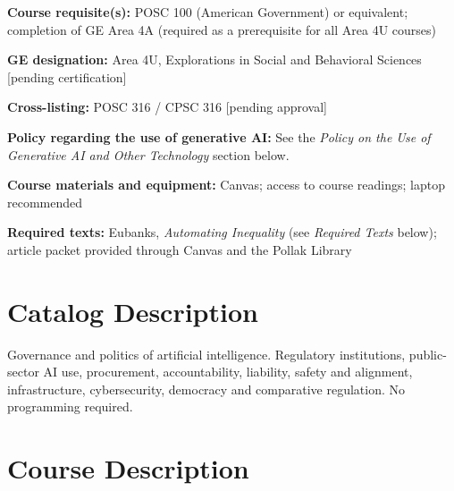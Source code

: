 \documentclass[12pt]{article}
\begin{document}
\vspace{0.5em}
\begin{flatlist}
\item \textbf{Course requisite(s):} POSC 100 (American Government) or equivalent; completion of GE Area 4A (required as a prerequisite for all Area 4U courses)
\item \textbf{GE designation:} Area 4U, Explorations in Social and Behavioral Sciences [pending certification]
\item \textbf{Cross-listing:} POSC 316 / CPSC 316 [pending approval]
\item \textbf{Policy regarding the use of generative AI:} See the \emph{Policy on the Use of Generative AI and Other Technology} section below.
\item \textbf{Course materials and equipment:} Canvas; access to course readings; laptop recommended
\item \textbf{Required texts:} Eubanks, \emph{Automating Inequality} (see \emph{Required Texts} below); article packet provided through Canvas and the Pollak Library
\end{flatlist}

\section*{Catalog Description}
Governance and politics of artificial intelligence. Regulatory institutions, public-sector AI use, procurement, accountability, liability, safety and alignment, infrastructure, cybersecurity, democracy and comparative regulation. No programming required.

\section*{Course Description}
\end{document}
